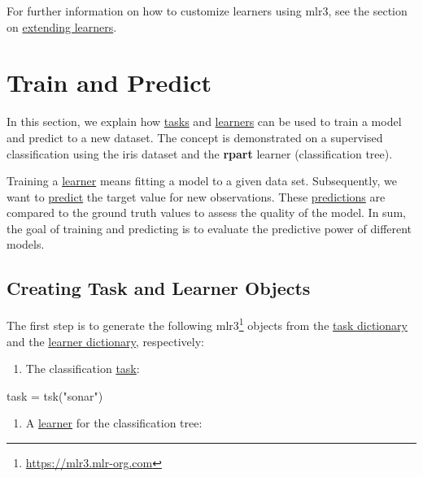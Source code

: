 \documentclass[12pt,]{scrbook}
\newenvironment{Shaded}{}{}
\newcommand{\KeywordTok}[1]{\textcolor[rgb]{0.00,0.00,1.00}{#1}}
\newcommand{\NormalTok}[1]{#1}
\newcommand{\StringTok}[1]{\textcolor[rgb]{0.00,0.50,0.50}{#1}}
\providecommand{\tightlist}{%
  \setlength{\itemsep}{0pt}\setlength{\parskip}{0pt}}
\renewcommand{\href}[2]{#2\footnote{\url{#1}}}
\begin{document}
For further information on how to customize learners using mlr3, see the section on \protect\hyperlink{ext-learner}{extending learners}.

\hypertarget{train-predict}{%
\section{Train and Predict}\label{train-predict}}

In this section, we explain how \protect\hyperlink{tasks}{tasks} and \protect\hyperlink{learners}{learners} can be used to train a model and predict to a new dataset.
The concept is demonstrated on a supervised classification using the iris dataset and the \textbf{rpart} learner (classification tree).

Training a \protect\hyperlink{learners}{learner} means fitting a model to a given data set.
Subsequently, we want to \protect\hyperlink{predicting}{predict} the target value for new observations.
These \protect\hyperlink{predicting}{predictions} are compared to the ground truth values to assess the quality of the model.
In sum, the goal of training and predicting is to evaluate the predictive power of different models.

\hypertarget{train-predict-objects}{%
\subsection{Creating Task and Learner Objects}\label{train-predict-objects}}

The first step is to generate the following \href{https://mlr3.mlr-org.com}{mlr3} objects from the \protect\hyperlink{tasks}{task dictionary} and the \protect\hyperlink{learners}{learner dictionary}, respectively:

\begin{enumerate}
\def\labelenumi{\arabic{enumi}.}
\tightlist
\item
  The classification \protect\hyperlink{tasks}{task}:
\end{enumerate}

\begin{Shaded}
\begin{Highlighting}[]
\NormalTok{task =}\StringTok{ }\KeywordTok{tsk}\NormalTok{(}\StringTok{"sonar"}\NormalTok{)}
\end{Highlighting}
\end{Shaded}

\begin{enumerate}
\def\labelenumi{\arabic{enumi}.}
\setcounter{enumi}{1}
\tightlist
\item
  A \protect\hyperlink{learners}{learner} for the classification tree:
\end{enumerate}
\end{document}
